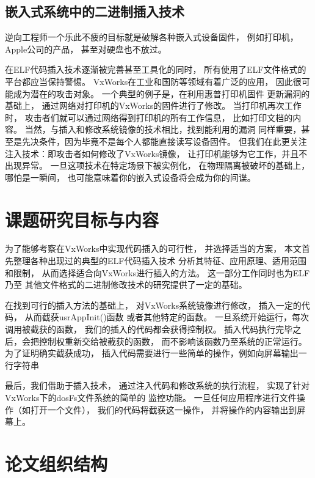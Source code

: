 \subsection{嵌入式系统中的二进制插入技术}

逆向工程师一个乐此不疲的目标就是破解各种嵌入式设备固件，
例如打印机，Apple公司的产品，
甚至对硬盘也不放过。


在ELF代码插入技术逐渐被完善甚至工具化的同时，
所有使用了ELF文件格式的平台都应当保持警惕。
VxWorks在工业和国防等领域有着广泛的应用，
因此很可能成为潜在的攻击对象。
一个典型的例子是\cite{printme}，在利用惠普打印机固件
更新漏洞的基础上，
通过网络对打印机的VxWorks的固件进行了修改。
当打印机再次工作时，
攻击者们就可以通过网络得到打印机的所有工作信息，
比如打印文档的内容。
当然，与插入和修改系统镜像的技术相比，找到能利用的漏洞
同样重要，甚至是先决条件，因为毕竟不是每个人都能直接读写设备固件。
但我们在此更关注注入技术：即攻击者如何修改了VxWorks镜像，
让打印机能够为它工作，并且不出现异常。
一旦这项技术在特定场景下被实例化，
在物理隔离被破坏的基础上，哪怕是一瞬间，
也可能意味着你的嵌入式设备将会成为你的间谍。

\section{课题研究目标与内容}

为了能够考察在VxWorks中实现代码插入的可行性，
并选择适当的方案，
本文首先整理各种出现过的典型的ELF代码插入技术
分析其特征、应用原理、适用范围和限制，
从而选择适合向VxWorks进行插入的方法。
这一部分工作同时也为ELF乃至
其他文件格式的二进制修改技术的研究提供了一定的基础。


在找到可行的插入方法的基础上，
对VxWorks系统镜像进行修改，
插入一定的代码，
从而截获usrAppInit()函数
或者其他特定的函数。
一旦系统开始运行，每次调用被截获的函数，
我们的插入的代码都会获得控制权。
插入代码执行完毕之后，会把控制权重新交给被截获的函数，
而不影响该函数乃至系统的正常运行。
为了证明确实截获成功，
插入代码需要进行一些简单的操作，例如向屏幕输出一行字符串


最后，我们借助于插入技术，
通过注入代码和修改系统的执行流程，
实现了针对VxWorks下的dosFs文件系统的简单的
监控功能。
一旦任何应用程序进行文件操作（如打开一个文件），
我们的代码将截获这一操作，
并将操作的内容输出到屏幕上。

\section{论文组织结构}


